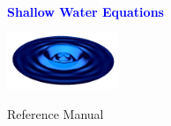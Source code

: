 \documentclass{softwaremanual}
\author{Joseph Schoonover}
\date{}
\newcommand{\swlogo}{{\includegraphics[width=0.25\textwidth]{images/shallowWater.png}}
}
\begin{document}
\frontmatter
\begin{titlingpage}
    
        \vspace*{2cm}

   {\selectfont
   \begin{center}
     \\

     \huge{\textbf{\textcolor{blue}{Shallow Water Equations}}}
   \end{center}
    }    
 
        \vspace{1cm}
        
        \begin{center}
         \swlogo
        \end{center}
        
        \vspace{2cm}
        
     \begin{center}
     
        {\selectfont
        \huge{
           Reference Manual
        }
        
        \vspace{1.5cm}
        
        \textbf{
        \large{
           \theauthor 
         }}}
        
        \vfill
        
        
     \end{center}
        
    
\end{titlingpage}


{\selectfont
\tableofcontents
}
\mainmatter

\pagestyle{myheadings}
\end{document}

